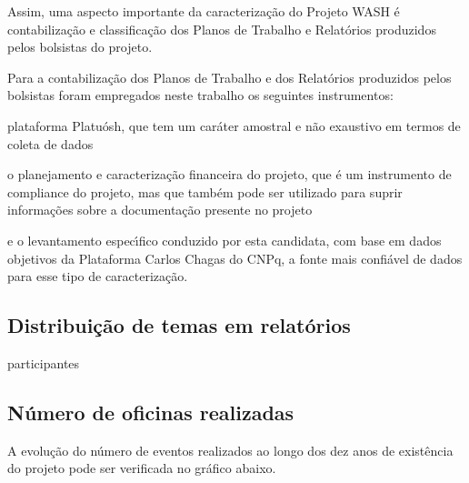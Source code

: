 \documentclass[
12pt,		%
openright,	%
twoside,  %
a4paper,			%
chapter=TITLE,		%
english,			%
french,				%
spanish,			%
brazil				%
]{USPSC-classe/USPSC}
\begin{document}
Assim, uma aspecto importante da caracteriza\c{c}\~ao do Projeto WASH \'e contabiliza\c{c}\~ao e classifica\c{c}\~ao dos Planos de Trabalho e Relat\'orios produzidos pelos bolsistas do projeto.














Para a contabiliza\c{c}\~ao dos Planos de Trabalho e dos Relat\'orios produzidos pelos bolsistas foram empregados neste trabalho os seguintes instrumentos:















\begin{alineas}
\item plataforma Platu\'osh, que tem um car\'ater amostral e n\~ao exaustivo em termos de coleta de dados
\item o planejamento e caracteriza\c{c}\~ao financeira do projeto, que \'e um instrumento de compliance do projeto, mas que tamb\'em pode ser utilizado para suprir informa\c{c}\~oes sobre a documenta\c{c}\~ao presente no projeto
\item e o levantamento espec\'{\i}fico conduzido por esta candidata, com base em dados objetivos da Plataforma Carlos Chagas do CNPq, a fonte mais confi\'avel de dados para esse tipo de caracteriza\c{c}\~ao.
\end{alineas}

\subsection[Distribui\c{c}\~ao de temas em relat\'orios]{Distribui\c{c}\~ao de temas em relat\'orios}\label{Distribui\c{c}\~ao de temas em relat\'orios}
participantes














\subsection[N\'umero de oficinas realizadas]{N\'umero de oficinas realizadas}\label{N\'umero de oficinas realizadas}
A evolu\c{c}\~ao do n\'umero de eventos realizados ao longo dos dez anos de exist\^encia do projeto pode ser verificada no gr\'afico abaixo.
\end{document}

